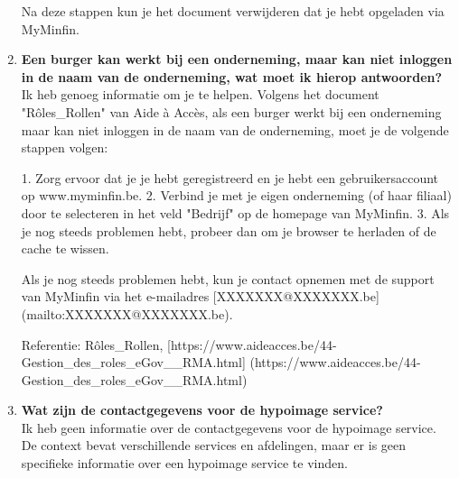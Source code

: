 \begin{enumerate}
    Na deze stappen kun je het document verwijderen dat je hebt opgeladen via MyMinfin.
    
    \item \textbf{Een burger kan werkt bij een onderneming, maar kan niet inloggen in de naam van de onderneming, wat moet ik hierop antwoorden?} \\
    
    Ik heb genoeg informatie om je te helpen. Volgens het document "Rôles\_Rollen" van Aide à Accès, als een burger werkt bij een onderneming maar kan niet inloggen in de naam van de onderneming, moet je de volgende stappen volgen:
    
    1. Zorg ervoor dat je je hebt geregistreerd en je hebt een gebruikersaccount op www.myminfin.be.
    2. Verbind je met je eigen onderneming (of haar filiaal) door te selecteren in het veld "Bedrijf" op de homepage van MyMinfin.
    3. Als je nog steeds problemen hebt, probeer dan om je browser te herladen of de cache te wissen.
    
    Als je nog steeds problemen hebt, kun je contact opnemen met de support van MyMinfin via het e-mailadres [XXXXXXX@XXXXXXX.be](mailto:XXXXXXX@XXXXXXX.be).
    
    Referentie: Rôles\_Rollen, [https://www.aideacces.be/44-Gestion\_des\_roles\_eGov\_\_RMA.html]
    (https://www.aideacces.be/44-Gestion\_des\_roles\_eGov\_\_RMA.html)
    
    \item \textbf{Wat zijn de contactgegevens voor de hypoimage service?} \\
    Ik heb geen informatie over de contactgegevens voor de hypoimage service. De context bevat verschillende services en afdelingen, maar er is geen specifieke informatie over een hypoimage service te vinden.
\end{enumerate}